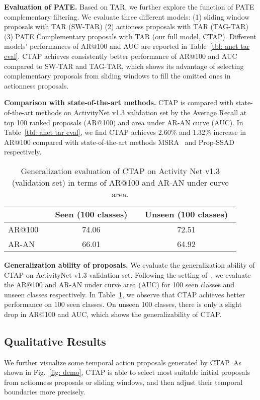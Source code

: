 \documentclass[runningheads]{llncs}
\begin{document}
\textbf{Evaluation of PATE.} Based on TAR, we further explore the function of PATE complementary filtering. 
We evaluate three different models: (1) sliding window proposals with TAR (SW-TAR) (2) actioness proposals with TAR (TAG-TAR) (3) PATE Complementary proposals with TAR (our full model, CTAP). 
Different models' performances of AR@100 and AUC are reported in Table~\ref{tbl: anet tar eval}. 
CTAP achieves consistently better performance of AR@100 and AUC compared to SW-TAR and TAG-TAR, which shows its advantage of selecting complementary proposals from sliding windows to fill the omitted ones in actionness proposals.

\textbf{Comparison with state-of-the-art methods.} CTAP is compared with state-of-the-art methods on ActivityNet v1.3 validation set by the Average Recall at top 100 ranked proposals (AR@100) and area under AR-AN curve (AUC). 
In Table~\ref{tbl: anet tar eval}, we find CTAP achieves 2.60\% and 1.32\% increase in AR@100 compared with state-of-the-art methods MSRA~\cite{yao2017msr} and  Prop-SSAD~\cite{lin2017temporal} respectively. 



\begin{table}[t]
\centering
\caption{Generalization evaluation of CTAP on Activity Net v1.3 (validation set) in terms of AR@100 and AR-AN under curve area.}\label{tbl: anet generalization}
\begin{tabular}{l*2c}
\toprule
{} &\ Seen (100 classes)\ &\ Unseen (100 classes)\ \\\midrule
AR@100\ &\ 74.06\ &\ 72.51\ \\ 
AR-AN\ &\ 66.01\ &\ 64.92\ \\\bottomrule
\end{tabular}
\end{table}

\textbf{Generalization ability of proposals.} 
We evaluate the generalization ability of CTAP on ActivityNet v1.3 validation set. Following the setting of~\cite{xiong2017pursuit}, we evaluate the AR@100 and AR-AN under curve area (AUC) for 100 seen classes and unseen classes respectively. 
In Table~\ref{tbl: anet generalization}, we observe that CTAP achieves better performance on 100 seen classes. On unseen 100 classes, there is only a slight drop in AR@100 and AUC, which shows the generalizability of CTAP.

\subsection{Qualitative Results}
We further visualize some temporal action proposals generated by CTAP. As shown in Fig.~\ref{fig: demo}, CTAP is able to select most suitable initial proposals from actionness proposals or sliding windows, and then adjust their temporal boundaries more precisely.
\end{document}
